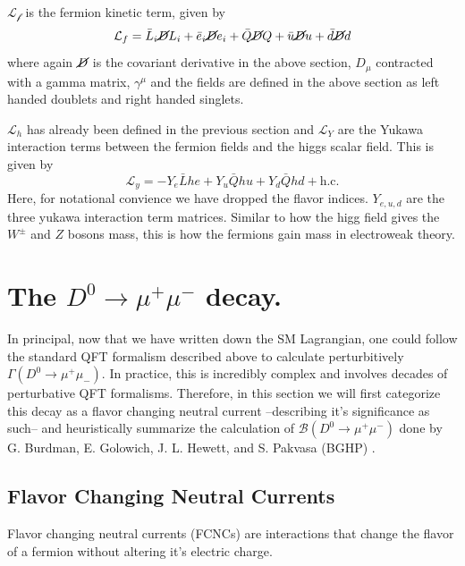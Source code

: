 $\mathcal{L_f}$ is the fermion kinetic term, given by
\begin{equation}
\mathcal{L}_{f} = \bar{L}_{i}\cancel{D}L_{i} + \bar{e}_{i}\cancel{D}e_{i} + \bar{Q}\cancel{D}Q + \bar{u} \cancel{D}u + \bar{d}\cancel{D}d
\label{eq:fermion_kinetic_term}
\end{equation}
where again $\cancel{D}$ is the covariant derivative in the above section, $D_\mu$ contracted with a gamma matrix, $\gamma^\mu$ and the fields are defined in the above section as left handed doublets and right handed singlets.

$\mathcal{L}_h$ has already been defined in the previous section and $\mathcal{L}_Y$ are the Yukawa interaction terms between the fermion fields and the higgs scalar field. This is given by
\begin{equation}
\mathcal{L}_{y} = - Y_{e} \bar{L}he + Y_{u}\bar{Q}h u + Y_{d} \bar{Q}h d
 + \text{h.c.}
\end{equation}
Here, for notational convience we have dropped the flavor indices. $Y_{e,u,d}$ are the three yukawa interaction term matrices. Similar to how the higg field gives the $W^\pm$ and $Z$ bosons mass, this is how the fermions gain mass in electroweak theory. 

\section{The $D^0 \to \mu^+ \mu^-$ decay.}

In principal, now that we have written down the SM Lagrangian, one could follow the standard QFT formalism described above to calculate perturbitively $\Gamma(D^0 \to \mu^+ \mu_-)$. In practice, this is incredibly complex and involves decades of perturbative QFT formalisms. Therefore, in this section we will first categorize this decay as a flavor changing neutral current --describing it's significance as such-- and heuristically summarize the calculation of $\mathcal{B}(D^0 \to \mu^+ \mu^-)$ done by G. Burdman, E. Golowich, J. L. Hewett, and S. Pakvasa (BGHP) \cite{ref:burdman_2002}.

\subsection{Flavor Changing Neutral Currents}

Flavor changing neutral currents (FCNCs) are interactions that change the flavor of a fermion without altering it's electric charge. 


